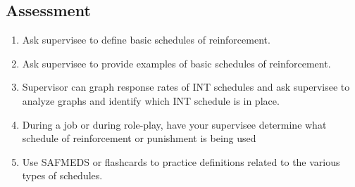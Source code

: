\subsection{Assessment}
\begin{enumerate}
\item Ask supervisee to define basic schedules of reinforcement.
\item Ask supervisee to provide examples of basic schedules of reinforcement.
\item Supervisor can graph response rates of INT schedules and ask supervisee to analyze graphs and identify which INT schedule is in place.
%
\item During a job or during role-play, have your supervisee determine what schedule of reinforcement or punishment is being used
\item Use SAFMEDS or flashcards to practice definitions related to the various types of schedules.
\end{enumerate}
%
